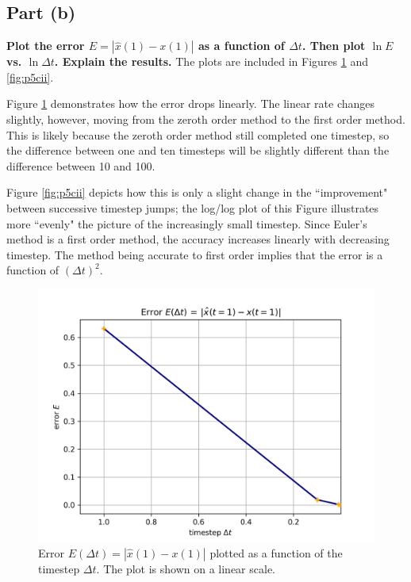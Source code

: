 \documentclass[draft]{agujournal2019}
\begin{document}
\subsection{Part (b)}
\label{subsec:p5b}
\textbf{Plot the error $E=|\hat{x}(1)-x(1)|$ as a function of $\Delta t$. Then plot $\ln{E}$ vs. $\ln{\Delta t}$. Explain the results. }
The plots are included in Figures \ref{fig:p5ci} and \ref{fig:p5cii}. 
\par
Figure \ref{fig:p5ci} demonstrates how the error drops linearly. The linear rate changes slightly, however, moving from the zeroth order method to the first order method. This is likely because the zeroth order method still completed one timestep, so the difference between one and ten timesteps will be slightly different than the difference between 10 and 100. 
\par
Figure \ref{fig:p5cii} depicts how this is only a slight change in the ``improvement" between successive timestep jumps; the log/log plot of this Figure illustrates more ``evenly" the picture of the increasingly small timestep. Since Euler's method is a first order method, the accuracy increases linearly with decreasing timestep. The method being accurate to first order implies that the error is a function of $(\Delta t)^2$.



\begin{figure}[t]
    \includegraphics[width=0.91\linewidth]{figs/figure2.8.3.c.i.png}
    \centering
    \caption{Error $E(\Delta t) = |\hat{x}(1)-x(1)|$ plotted as a function of the timestep $\Delta t$. The plot is shown on a linear scale. }
    \label{fig:p5ci}
\end{figure}
\end{document}
